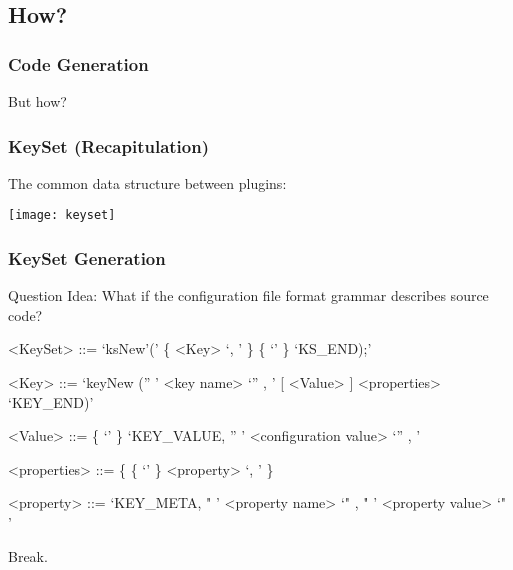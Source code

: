\subsection{How?}

\begin{frame}
	\frametitle{Code Generation}


	\pause
	\vspace{2em}
	But how?
\end{frame}

\begin{frame}
	\frametitle{KeySet (Recapitulation)}

	The common data structure between plugins:
	\vspace{1cm}

	\texttt{[image: keyset]}
\end{frame}

\begin{frame}[fragile]
	\frametitle{KeySet Generation}
	\begin{alertblock}{Question}
	Idea: What if the configuration file format grammar describes source code?
	\end{alertblock}
	\pause

	\begin{grammar}
	<KeySet> ::= \lq ksNew'\WhiteSpace(' \{ <Key> \lq , \LineBreak'  \}  \{ \lq\WhiteSpace' \} \lq KS\_END);'

	<Key> ::= \lq keyNew \WhiteSpace ('' ' <key name> \lq ''  , \LineBreak' [ <Value> ] <properties> \lq KEY_END)'

	<Value> ::=  \{ \lq\WhiteSpace' \} \lq KEY\_VALUE, \WhiteSpace '' ' <configuration value> \lq ''  , \LineBreak'

	<properties> ::= \{ \{ \lq\WhiteSpace' \} <property> \lq , \LineBreak' \}

	<property> ::=  \lq KEY\_META, \WhiteSpace " ' <property name> \lq "  , \WhiteSpace " ' <property value> \lq " '
	\end{grammar}
\end{frame}

\begin{assignment}
	\begin{task}
	Break.
	\end{task}
\end{assignment}

